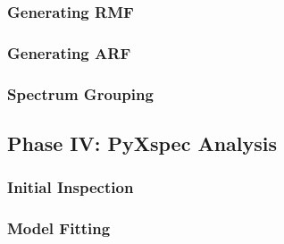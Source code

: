     		\subsubsection*{Generating RMF}
    			
    			
    		
    		\subsubsection*{Generating ARF}
    			
    			
    			
    		\subsubsection*{Spectrum Grouping}
    			
    			
    			
    	
    	\subsection{Phase IV: PyXspec Analysis}
    		
    		
    		
    		
    		\subsubsection*{Initial Inspection}
    			
    			
    			
    		\subsubsection*{Model Fitting}
    			
    			
    			
    			
    			
    			
    			
    			
